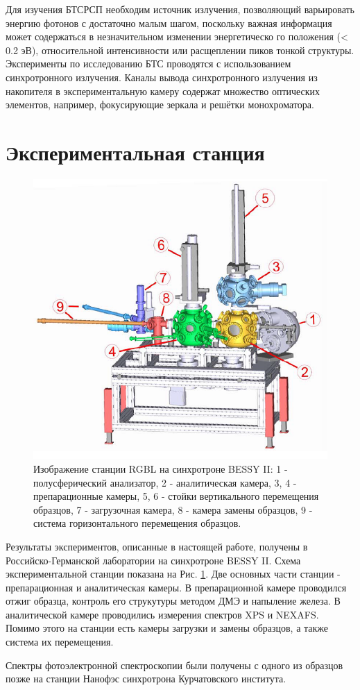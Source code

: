 Для изучения БТСРСП необходим источник излучения, позволяющий варьировать энергию фотонов с достаточно малым шагом, поскольку важная информация может содержаться в незначительном изменении энергетическо го положения (< 0.2 эВ), относительной интенсивности или расщеплении пиков тонкой структуры. Эксперименты по исследованию БТС проводятся с использованием синхротронного излучения. Каналы вывода синхротронного
излучения из накопителя в экспериментальную камеру содержат множество оптических элементов, например, фокусирующие зеркала и решётки монохроматора.
\section{ Экспериментальная станция}
 \begin{figure}[ht] 
  \center
  \includegraphics [scale=0.47] {./Dissertation/images/station.png}
  \caption{Изображение станции RGBL на синхротроне BESSY II: 1 - полусферический анализатор, 2 - аналитическая камера, 3, 4 - препарационные камеры, 5, 6 - стойки вертикального перемещения образцов, 7 - загрузочная камера, 8 - камера замены образцов, 9 - система горизонтального перемещения образцов.} 
  \label{img:bessy}  
\end{figure}
Результаты экспериментов, описанные в настоящей работе, получены в Российско-Германской лаборатории на синхротроне BESSY II. Схема экспериментальной станции показана на Рис. \ref{img:bessy}. Две основных части станции - препарационная и аналитическая камеры. В препарационной камере проводился отжиг образца, контроль его струкутуры методом ДМЭ и напыление железа. В аналитической камере проводились измерения спектров XPS и NEXAFS. Помимо этого на станции есть камеры загрузки и замены образцов, а также система их перемещения.

Спектры фотоэлектронной спектроскопии были получены с одного из образцов позже на станции Нанофэс синхротрона Курчатовского института.


